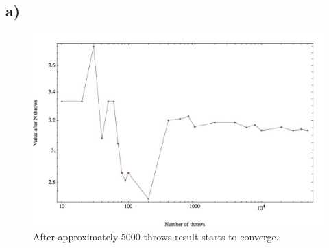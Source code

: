 \documentclass[12pt]{article}
\numberwithin{equation}{section}
\numberwithin{table}{section}
\begin{document}
\subsection*{a)}
\begin{figure}
\caption{After approximately 5000 throws result starts to converge.}
	\includegraphics[width=15cm]{mc_p01_b.jpg}
\end{figure}
\end{document}
